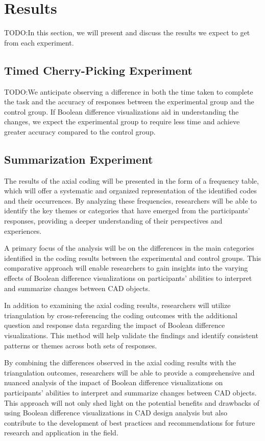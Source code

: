 \documentclass[sigconf,authorversion,nonacm]{acmart}
\begin{document}
\section{Results}

TODO:In this section, we will present and discuss the results we expect to get from each experiment.

\subsection{Timed Cherry-Picking Experiment}

TODO:We anticipate observing a difference in both the time taken to complete the task and the accuracy of responses between the experimental group and the control group. If Boolean difference visualizations aid in understanding the changes, we expect the experimental group to require less time and achieve greater accuracy compared to the control group.

\subsection{Summarization Experiment}

The results of the axial coding will be presented in the form of a frequency table, which will offer a systematic and organized representation of the identified codes and their occurrences.
By analyzing these frequencies, researchers will be able to identify the key themes or categories that have emerged from the participants' responses, providing a deeper understanding of their perspectives and experiences.

A primary focus of the analysis will be on the differences in the main categories identified in the coding results between the experimental and control groups.
This comparative approach will enable researchers to gain insights into the varying effects of Boolean difference visualizations on participants' abilities to interpret and summarize changes between CAD objects.

In addition to examining the axial coding results, researchers will utilize triangulation by cross-referencing the coding outcomes with the additional question and response data regarding the impact of Boolean difference visualizations.
This method will help validate the findings and identify consistent patterns or themes across both sets of responses.

By combining the differences observed in the axial coding results with the triangulation outcomes, researchers will be able to provide a comprehensive and nuanced analysis of the impact of Boolean difference visualizations on participants' abilities to interpret and summarize changes between CAD objects.
This approach will not only shed light on the potential benefits and drawbacks of using Boolean difference visualizations in CAD design analysis but also contribute to the development of best practices and recommendations for future research and application in the field.
\end{document}
